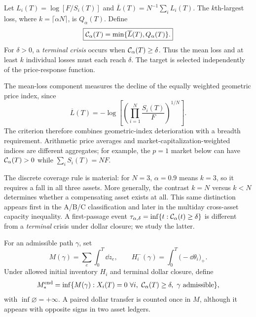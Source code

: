 \documentclass[review,hidelinks,onefignum,onetabnum]{siamonline250211}
\begin{document}
\begin{definition}\label{def:crash}
Let $L_i(T)=\log[F/S_i(T)]$ and $\overline L(T)=N^{-1}\sum_i L_i(T)$. The $k$th-largest loss, where $k=\lceil\alpha N\rceil$, is $Q_\alpha(T)$. Define
\begin{equation}\label{eq:crash}
\boxed{\mathcal{C}_\alpha(T)=\min\{\overline L(T),Q_\alpha(T)\}.}
\end{equation}
For $\delta>0$, a \emph{terminal crisis} occurs when $\mathcal{C}_\alpha(T)\ge\delta$. Thus the mean loss and at least $k$ individual losses must each reach $\delta$. The target is selected independently of the price-response function.
\end{definition}

The mean-loss component measures the decline of the equally weighted geometric price index, since
\[
\overline L(T)=-\log\!\left[\left(\prod_{i=1}^{N}\frac{S_i(T)}{F}\right)^{1/N}\right].
\]
The criterion therefore combines geometric-index deterioration with a breadth requirement. Arithmetic price averages and market-capitalization-weighted indices are different aggregates; for example, the $p=1$ market below can have $\mathcal{C}_\alpha(T)>0$ while $\sum_i S_i(T)=NF$.

The discrete coverage rule is material: for $N=3$, $\alpha=0.9$ means $k=3$, so it requires a fall in all three assets. More generally, the contrast $k=N$ versus $k<N$ determines whether a compensating asset exists at all. This same distinction appears first in the A/B/C classification and later in the multiday cross-asset capacity inequality. A first-passage event $\tau_{\alpha,\delta}=\inf\{t:\mathcal{C}_\alpha(t)\ge\delta\}$ is different from a \emph{terminal} crisis under dollar closure; we study the latter.

\begin{definition}\label{def:budget}
For an admissible path $\gamma$, set
\begin{equation}\label{eq:resource}
M(\gamma)=\sum_e\int_0^T\dd z_e,\qquad
H_i^-(\gamma)=\int_0^T\big(-\dd\theta_i\big)_+.
\end{equation}
Under allowed initial inventory $H_i$ and terminal dollar closure, define
\begin{equation}\label{eq:minbudget}
M_*^{\rm end}=\inf\{M(\gamma): X_i(T)=0\ \forall i,\ \Cris_\alpha(T)\ge\delta,\ \gamma\text{ admissible}\},
\end{equation}
with $\inf\varnothing=+\infty$. A paired dollar transfer is counted once in $M$, although it appears with opposite signs in two asset ledgers.
\end{definition}
\end{document}
